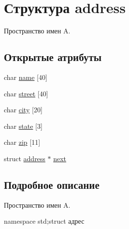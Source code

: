 \hypertarget{structaddress}{\section{Структура address}
\label{structaddress}
}


Пространство имен A.  


\subsection*{Открытые атрибуты}
\begin{DoxyCompactItemize}
\item 
char \hyperlink{structaddress_a2aaf4b88edfd2d1fc111fe66161a0c20}{name} \mbox{[}40\mbox{]}
\item 
char \hyperlink{structaddress_a6637fb175db73273b18545c7e862d0e9}{street} \mbox{[}40\mbox{]}
\item 
char \hyperlink{structaddress_a4852ddbf08c42594e621cd02e5896aa5}{city} \mbox{[}20\mbox{]}
\item 
char \hyperlink{structaddress_ac8434820bdc27fbb4fc3ead62b1983ec}{state} \mbox{[}3\mbox{]}
\item 
char \hyperlink{structaddress_a4d23b9ff269dec0d61b9398e2a0eb3aa}{zip} \mbox{[}11\mbox{]}
\item 
struct \hyperlink{structaddress}{address} $\ast$ \hyperlink{structaddress_a7fc6469ede585dbf482921487f2e233c}{next}
\end{DoxyCompactItemize}


\subsection{Подробное описание}
Пространство имен A. 

namespace std;struct адрес 

